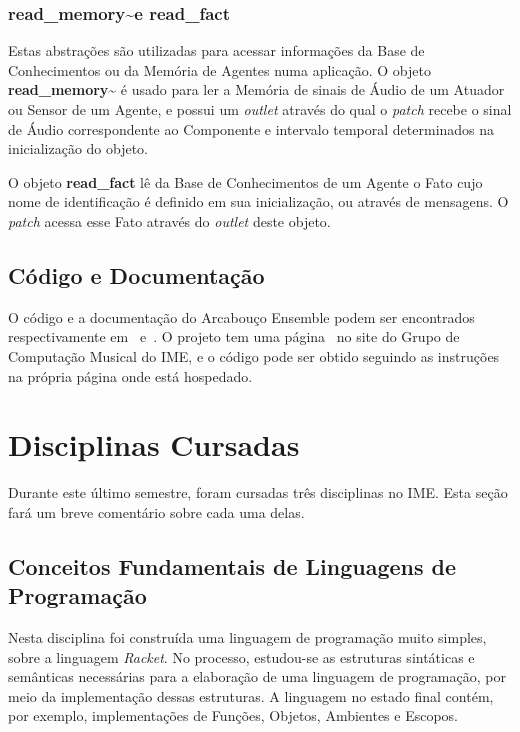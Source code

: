 \documentclass[a4paper, 11pt, twoside]{article}
\begin{document}
\begin{multicols}{2}
\subsubsection{read\_memory\textasciitilde e read\_fact}

Estas abstrações são utilizadas para acessar informações da Base
de Conhecimentos ou da Memória de Agentes numa aplicação. O objeto
\textbf{read\_memory\textasciitilde} é usado para ler a Memória de
sinais de Áudio de um Atuador ou Sensor de um Agente, e possui
um \textit{outlet} através do qual o \textit{patch} recebe o sinal
de Áudio correspondente ao Componente e intervalo temporal determinados
na inicialização do objeto.

O objeto \textbf{read\_fact} lê da Base de Conhecimentos de um Agente
o Fato cujo nome de identificação é definido em sua inicialização, ou
através de mensagens. O \textit{patch} acessa esse Fato através do
\textit{outlet} deste objeto.

\subsection{Código e Documentação}

O código e a documentação do Arcabouço Ensemble podem ser encontrados
respectivamente em~\cite{ensemblecode} e~\cite{ensembledoc}.
O projeto tem uma página~\cite{ensemblegrouppage} no site do Grupo de Computação 
Musical do IME, e o código pode ser obtido seguindo as instruções na própria página
onde está hospedado.

\section{Disciplinas Cursadas}

Durante este último semestre, foram cursadas três disciplinas no IME.
Esta seção fará um breve comentário sobre cada uma delas.

\subsection{Conceitos Fundamentais de Linguagens de Programação}

Nesta disciplina foi construída uma linguagem de programação muito
simples, sobre a linguagem \textit{Racket}. No processo, estudou-se
as estruturas sintáticas e semânticas necessárias para a elaboração
de uma linguagem de programação, por meio da implementação dessas
estruturas. A linguagem no estado final contém, por exemplo,
implementações de Funções, Objetos, Ambientes e Escopos.


\end{multicols}
\end{document}
